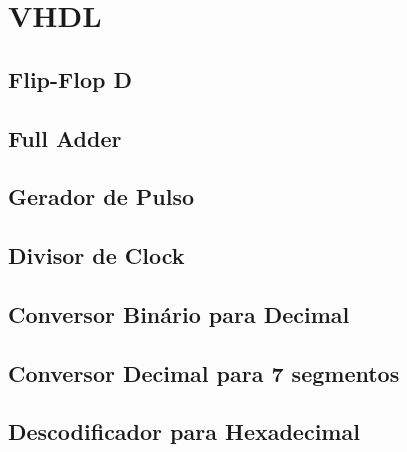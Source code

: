 \pagestyle{geral}
\appendix
\setlength{\columnseprule}{0.4pt}
\section{VHDL}

\subsection{Flip-Flop D}
\vspace*{\fill}

\vspace*{\fill}%

\subsection{Full Adder}
\vspace*{\fill}

\vspace*{\fill}%

\subsection{Gerador de Pulso}
\vspace*{\fill}

\vspace*{\fill}%

\subsection{Divisor de Clock}
\vspace*{\fill}

\vspace*{\fill}%

\subsection{Conversor Binário para Decimal}
\vspace*{\fill}

\vspace*{\fill}%

\subsection{Conversor Decimal para 7 segmentos}
\vspace*{\fill}

\vspace*{\fill}%

\subsection{Descodificador para Hexadecimal}
\vspace*{\fill}

\vspace*{\fill}%

